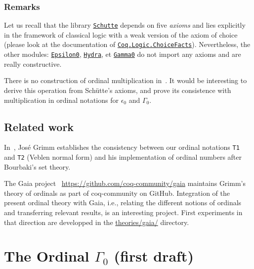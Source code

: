 




\subsection{Remarks}
Let us recall that the library \href{../theories/html/hydras.Schutte.Schutte.html}%
{\texttt{Schutte}} depends on five \emph{axioms} and lies explicitly in the  
framework of classical logic with a weak version of the axiom of choice
(please look at the documentation of
\href{https://coq.inria.fr/distrib/current/stdlib/Coq.Logic.ChoiceFacts.html}{\texttt{Coq.Logic.ChoiceFacts}}).
Nevertheless, the other modules:
\href{../theories/html/hydras.Epsilon0.Epsilon0.html}%
{\texttt{Epsilon0}},
\href{../theories/html/hydras.Hydra.Hydra.html}%
{\texttt{Hydra}}, et 
\href{../theories/html/hydras.Gamma0.Gamma0.html}%
{\texttt{Gamma0}}
do not import any axioms and are really constructive.

\begin{project}
There is no construction of ordinal multiplication in~\cite{schutte}. 
It would be interesting to derive this operation from Schütte's axioms,
and prove its consistence with multiplication in ordinal notations for 
$\epsilon_0$ and $\Gamma_0$.
\end{project}

\section{Related work}

In~\cite{grimm:hal-00911710}, José Grimm establishes the consistency between our ordinal notations \texttt{T1} and \texttt{T2} (Veblen normal form) and his implementation
of ordinal numbers after Bourbaki's set theory.

The Gaia project ~\url{https://github.com/coq-community/gaia} maintains Grimm's  theory of ordinals as part of coq-community on GitHub. Integration
of the present ordinal theory with Gaia, i.e., relating the different notions of ordinals
and transferring relevant results, is an interesting project.
First experiments in that direction are developped in
the \href{https://github.com/coq-community/hydra-battles/blob/master/theories/gaia/}{theories/gaia/} directory.




\chapter{The Ordinal \texorpdfstring{$\Gamma_0$}{Gamma0} (first draft)}


